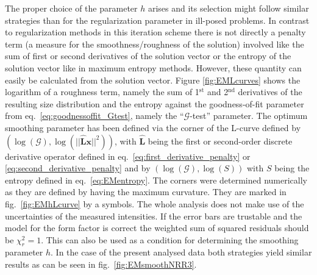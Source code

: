 The proper choice of the parameter $h$ arises and its selection might follow similar strategies than for the regularization parameter in ill-posed problems. In contrast to regularization methods in this iteration scheme there is not directly a penalty term (a measure for the smoothness/roughness of the solution) involved like the sum of first or second derivatives of the solution vector or the entropy of the solution vector like in maximum entropy methods. However, these quantity can easily be calculated from the solution vector. Figure \ref{fig:EMLcurves} shows the logarithm of a roughness term, namely the sum of 1$^\mathrm{st}$ and 2$^\mathrm{nd}$ derivatives of the resulting size distribution and the entropy against the goodness-of-fit parameter from eq.\ \ref{eq:goodnessoffit_Gtest}, namely the ``$\mathcal{G}$-test'' parameter. The optimum smoothing parameter has been defined via the corner of the L-curve defined by $(\log(\mathcal{G}),\log(|| \hat{\mathbf{L}} \mathbf{x} ||^2))$, with $\hat{\mathbf{L}}$ being the first or second-order discrete derivative operator defined in eq.\ \ref{eq:first_derivative_penalty} or \ref{eq:second_derivative_penalty} and by $(\log(\mathcal{G}),\log(S))$ with $S$ being the entropy defined in eq.\ \ref{eq:EMentropy}. The corners were determined numerically as they are defined by having the maximum curvature. They are marked in fig.\ \ref{fig:EMhLcurve} by a symbols. The whole analysis does not make use of the uncertainties of the measured intensities. If the error bars are trustable and the model for the form factor is correct the weighted sum of squared residuals should be $\chi_r^2= 1$. This can also be used as a condition for determining the smoothing parameter $h$. In the case of the present analysed data both strategies yield similar results as can be seen in fig.\ \ref{fig:EMsmoothNRR3}.

~\\

